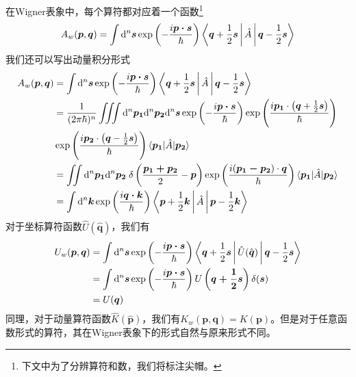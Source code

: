 \documentclass[hyperref,UTF8]{ctexbook}
\begin{document}
\indent 在Wigner表象中，每个算符都对应着一个函数\footnote[7]{下文中为了分辨算符和数，我们将标注尖帽。}
\[A_w(\boldsymbol{p},\boldsymbol{q})=\int\mathrm{d}^n\boldsymbol{s}\exp\left(-\frac{i\boldsymbol{p\cdot s}}{\hbar}\right)\Braket{\boldsymbol{q}+\frac{1}{2}\boldsymbol{s}|\hat{A}|\boldsymbol{q}-\frac{1}{2}\boldsymbol{s}}\]
我们还可以写出动量积分形式
\begin{align*}
	A_w(\boldsymbol{p},\boldsymbol{q})&=\int\mathrm{d}^n\boldsymbol{s}\exp\left(-\frac{i\boldsymbol{p\cdot s}}{\hbar}\right)\Braket{\boldsymbol{q}+\frac{1}{2}\boldsymbol{s}|\hat{A}|\boldsymbol{q}-\frac{1}{2}\boldsymbol{s}}\\
	&=\frac{1}{(2\pi\hbar)^{n}}\iiint\mathrm{d}^n\boldsymbol{p_1}\mathrm{d}^n\boldsymbol{p_2}\mathrm{d}^n\boldsymbol{s}\exp\left(-\frac{i\boldsymbol{p\cdot s}}{\hbar}\right)\exp\left(\frac{i\boldsymbol{p_1}\cdot\left(\boldsymbol{q}+\frac{1}{2}\boldsymbol{s}\right)}{\hbar}\right)\\
	&\exp\left(\frac{i\boldsymbol{p_2}\cdot\left(\boldsymbol{q}-\frac{1}{2}\boldsymbol{s}\right)}{\hbar}\right)\braket{\boldsymbol{p_1}|\hat{A}|\boldsymbol{p_2}}\\
	&=\iint\mathrm{d}^n\boldsymbol{p_1}\mathrm{d}^n\boldsymbol{p_2}\;\delta\left(\frac{\boldsymbol{p_1+p_2}}{2}-\boldsymbol{p}\right)\exp\left(\frac{i(\boldsymbol{p_1-p_2})\cdot\boldsymbol{q}}{\hbar}\right)\braket{\boldsymbol{p_1}|\hat{A}|\boldsymbol{p_2}}\\
	&=\int\mathrm{d}^n\boldsymbol{k}\exp\left(\frac{i\boldsymbol{q\cdot k}}{\hbar}\right)\Braket{\boldsymbol{p}+\frac{1}{2}\boldsymbol{k}|\hat{A}|\boldsymbol{p}-\frac{1}{2}\boldsymbol{k}}
\end{align*}
对于坐标算符函数$\hat{U}(\hat{\boldsymbol{q}})$，我们有
\begin{align*}
	U_w(\boldsymbol{p},\boldsymbol{q})&=\int\mathrm{d}^n\boldsymbol{s}\exp\left(-\frac{i\boldsymbol{p\cdot s}}{\hbar}\right)\Braket{\boldsymbol{q}+\frac{1}{2}\boldsymbol{s}|\hat{U}(\hat{\boldsymbol{q}})|\boldsymbol{q}-\frac{1}{2}\boldsymbol{s}}\\
	&=\int\mathrm{d}^n\boldsymbol{s}\exp\left(-\frac{i\boldsymbol{p\cdot s}}{\hbar}\right)U\left(\boldsymbol{q+\frac{1}{2}s}\right)\delta(\boldsymbol{s})\\
	&=U(\boldsymbol{q})
\end{align*}
同理，对于动量算符函数$\hat{K}(\hat{\boldsymbol{p}})$，我们有$K_w(\boldsymbol{p},\boldsymbol{q})=K(\boldsymbol{p})$。但是对于任意函数形式的算符，其在Wigner表象下的形式自然与原来形式不同。\\
\end{document}
